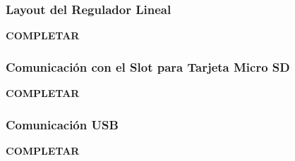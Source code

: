 \subsubsection{Layout del Regulador Lineal}

\textbf{{\color{red} COMPLETAR}}

\subsubsection{Comunicación con el Slot para Tarjeta Micro SD}


\textbf{{\color{red} COMPLETAR}}

\subsubsection{Comunicación USB}


\textbf{{\color{red} COMPLETAR}}